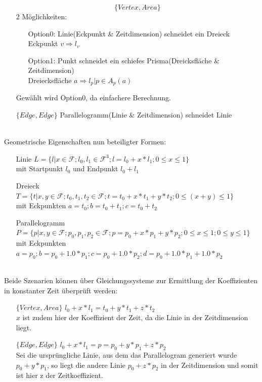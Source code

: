 		\begin{itemize}
			\item [$$\{Vertex, Area\}$$] 2 Möglichkeiten:
				\begin{itemize}
					\item[Option0:] Linie(Eckpunkt \& Zeitdimension) schneidet ein Dreieck\\
					Eckpunkt $v \Rightarrow l_v$
					\item[Option1:] Punkt schneidet ein schiefes Prisma(Dreicksfläche \& Zeitdimension)\\
					Dreiecksfläche $a \Rightarrow {l_p | p \in A_p(a)}$
				\end{itemize}
				Gewählt wird Option0, da einfachere Berechnung.
			\item [$\{Edge, Edge\}$]  Parallelogramm(Linie \& Zeitdimension) schneidet Linie
		\end{itemize}
\ \\
		Geometrische Eigenschaften nun beteiligter Formen:
		\begin{itemize}
			\item [Linie] $L = \{l | x\in\mathcal{F} ; l_0, l_1 \in \mathcal{F}^3 ; l = l_0 + x * l_1; 0\le x\le 1 \}$ \\
			mit Startpunkt $l_0$ und Endpunkt $l_0 + l_1$
		\item [Dreieck] $T = \{t | x,y \in\mathcal{F}; t_0, t_1, t_2 \in \mathcal{F}; t = t_0 + x*t_1 + y*t_2; 0\le (x+y) \le 1\}$\\
			mit Eckpunkten $a = t_0 ; b = t_0 + t_1 ; c = t_0 + t_2$ 
			\item [Parallelogramm] $P = \{p | x,y \in\mathcal{F}; p_0, p_1, p_2 \in \mathcal{F}; p = p_0 + x*p_1 + y*p_2; 0\le x\le 1; 0\le y\le 1\}$\\
			mit Eckpunkten $a = p_0 ; b = p_0 + 1.0*p_1 ; c = p_0 + 1.0*p_2; d = p_0 + 1.0*p_1 + 1.0*p_2$ 
		\end{itemize}
\ \\
		Beide Szenarien können über Gleichungssysteme zur Ermittlung der Koeffizienten in konstanter Zeit überprüft werden:
		\begin{itemize}
			\item [$\{Vertex, Area\}$] $l_0 + x * l_1 = t_0 + y*t_1 + z*t_2$\\
				$x$ ist zudem hier der Koeffizient der Zeit, da die Linie in der Zeitdimension liegt.
			\item [$\{Edge, Edge\}$] $l_0 + x * l_1 = p = p_0 + y*p_1 + z*p_2$\\
				Sei die ursprüngliche Linie, aus dem das Parallelogram generiert wurde $p_0+y*p_1$, so liegt die andere Linie $p_0 + z*p_2$ in der Zeitdimension und somit ist hier z der Zeitkoeffizient.
		\end{itemize}
